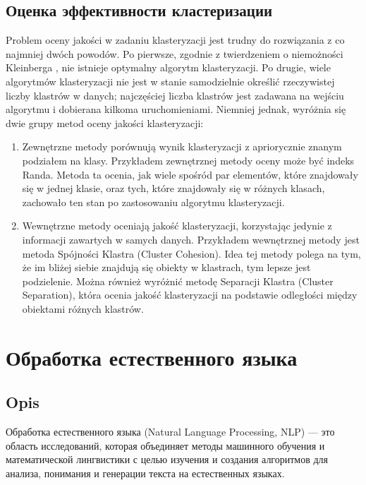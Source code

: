	\subsection{Оценка эффективности кластеризации}
		Problem oceny jakości w zadaniu klasteryzacji jest trudny do rozwiązania z co najmniej dwóch powodów. Po pierwsze, zgodnie z twierdzeniem o niemożności Kleinberga \cite{Kleinberg}, nie istnieje optymalny algorytm klasteryzacji. Po drugie, wiele algorytmów klasteryzacji nie jest w stanie samodzielnie określić rzeczywistej liczby klastrów w danych; najczęściej liczba klastrów jest zadawana na wejściu algorytmu i dobierana kilkoma uruchomieniami.
		Niemniej jednak, wyróżnia się dwie grupy metod oceny jakości klasteryzacji:
		\begin{enumerate}
			\item Zewnętrzne metody porównują wynik klasteryzacji z apriorycznie znanym podziałem na klasy. Przykładem zewnętrznej metody oceny może być indeks Randa. Metoda ta ocenia, jak wiele spośród par elementów, które znajdowały się w jednej klasie, oraz tych, które znajdowały się w różnych klasach, zachowało ten stan po zastosowaniu algorytmu klasteryzacji.
			\item Wewnętrzne metody oceniają jakość klasteryzacji, korzystając jedynie z informacji zawartych w samych danych. Przykładem wewnętrznej metody jest metoda Spójności Klastra (Cluster Cohesion). Idea tej metody polega na tym, że im bliżej siebie znajdują się obiekty w klastrach, tym lepsze jest podzielenie. Można również wyróżnić metodę Separacji Klastra (Cluster Separation), która ocenia jakość klasteryzacji na podstawie odległości między obiektami różnych klastrów.
		\end{enumerate}


\section{Обработка естественного языка}

	\subsection{Opis}
		Обработка естественного языка (Natural Language Processing, NLP) — это область исследований, которая объединяет методы машинного обучения и математической лингвистики с целью изучения и создания алгоритмов для анализа, понимания и генерации текста на естественных языках. \cite{NLP}



